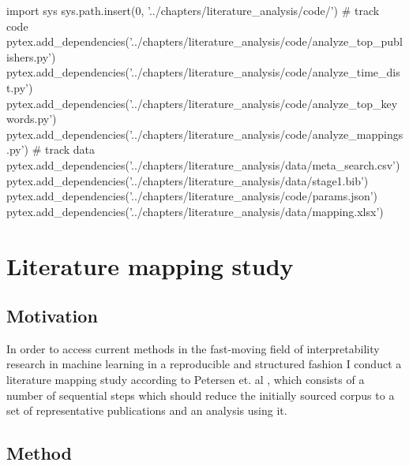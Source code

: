 % 
\begin{pycode}
import sys
sys.path.insert(0, '../chapters/literature_analysis/code/')
# track code
pytex.add_dependencies('../chapters/literature_analysis/code/analyze_top_publishers.py')
pytex.add_dependencies('../chapters/literature_analysis/code/analyze_time_dist.py')
pytex.add_dependencies('../chapters/literature_analysis/code/analyze_top_keywords.py')
pytex.add_dependencies('../chapters/literature_analysis/code/analyze_mappings.py')
# track data
pytex.add_dependencies('../chapters/literature_analysis/data/meta_search.csv')
pytex.add_dependencies('../chapters/literature_analysis/data/stage1.bib')
pytex.add_dependencies('../chapters/literature_analysis/code/params.json')
pytex.add_dependencies('../chapters/literature_analysis/data/mapping.xlsx')
\end{pycode}

\chapter{Literature mapping study}
\label{chap:literature_analysis}

\section{Motivation}

In order to access current methods in the fast-moving field of interpretability research in machine learning in a reproducible and structured fashion I conduct a literature mapping study according to Petersen et. al \cite{petersenSystematicMappingStudies}, which consists of a number of sequential steps which should reduce the initially sourced corpus to a set of representative publications and an analysis using it.

\section{Method}

